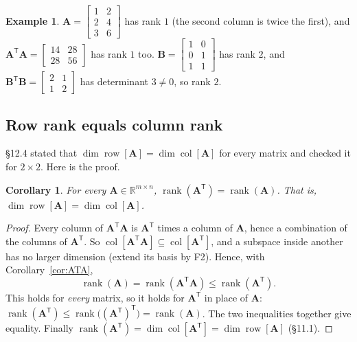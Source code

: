 \documentclass[11pt]{article}
\theoremstyle{plain}
\newtheorem{cor}[thm]{Corollary}
\theoremstyle{definition}
\newtheorem{ex}{Example}[section]
\theoremstyle{remark}
\newcommand{\R}{\mathbb{R}}
\newcommand{\mt}[1]{\mathbf{#1}}
\newcommand{\T}{^{\mathsf{T}}}
\newcommand{\colsp}[1]{\operatorname{col}[#1]}
\newcommand{\rowsp}[1]{\operatorname{row}[#1]}
\DeclareMathOperator{\rank}{rank}
\begin{document}
\begin{ex}
$\mt{A}=\begin{bmatrix}1&2\\2&4\\3&6\end{bmatrix}$ has rank $1$ (the second column
is twice the first), and
$\mt{A}\T\mt{A}=\begin{bmatrix}14&28\\28&56\end{bmatrix}$ has rank $1$ too.
$\mt{B}=\begin{bmatrix}1&0\\0&1\\1&1\end{bmatrix}$ has rank $2$, and
$\mt{B}\T\mt{B}=\begin{bmatrix}2&1\\1&2\end{bmatrix}$ has determinant $3\neq0$,
so rank $2$.
\end{ex}

\subsection{Row rank equals column rank}
\S12.4 stated that $\dim\rowsp{\mt{A}}=\dim\colsp{\mt{A}}$ for every matrix and
checked it for $2\times2$. Here is the proof.

\begin{cor}
\label{cor:rowrank}
For every $\mt{A}\in\R^{m\times n}$, $\rank(\mt{A}\T)=\rank(\mt{A})$. That is,
$\dim\rowsp{\mt{A}}=\dim\colsp{\mt{A}}$.
\end{cor}

\begin{proof}
Every column of $\mt{A}\T\mt{A}$ is $\mt{A}\T$ times a column of $\mt{A}$, hence
a combination of the columns of $\mt{A}\T$. So
$\colsp{\mt{A}\T\mt{A}}\subseteq\colsp{\mt{A}\T}$, and a subspace inside another
has no larger dimension (extend its basis by F2). Hence, with
Corollary~\ref{cor:ATA},
\[
  \rank(\mt{A})=\rank(\mt{A}\T\mt{A})\le\rank(\mt{A}\T).
\]
This holds for \emph{every} matrix, so it holds for $\mt{A}\T$ in place of
$\mt{A}$: $\rank(\mt{A}\T)\le\rank\bigl((\mt{A}\T)\T\bigr)=\rank(\mt{A})$. The two
inequalities together give equality. Finally $\rank(\mt{A}\T)=\dim\colsp{\mt{A}\T}
=\dim\rowsp{\mt{A}}$ (\S11.1).
\end{proof}
\end{document}
